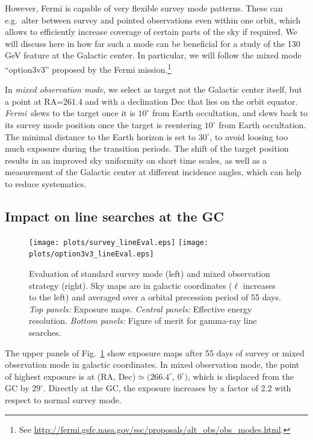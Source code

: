 \documentclass[aps,prd,superscriptaddress,showpacs,nofootinbib,fixlfloat, 12pt]{revtex4-1}
\newcommand{\Fermi}{{\slshape Fermi}}
\begin{document}
However, Fermi is capable of very flexible survey mode patterns. These can
e.g.~alter between survey and pointed observations even within one orbit,
which allows to efficiently increase coverage of certain parts of the sky if
required. We will discuss here in how far such a mode can be beneficial for a
study of the 130 GeV feature at the Galactic center. In particular, we will
follow the mixed mode ``option3v3'' proposed by the Fermi
mission.\footnote{See
\url{http://fermi.gsfc.nasa.gov/ssc/proposals/alt_obs/obs_modes.html}.}

In \emph{mixed observation mode}, we select as target not the Galactic center
itself, but a point at RA=261.4 and with a declination Dec that lies on the
orbit equator. \Fermi\ slews to the target once it is $10^\circ$ from Earth
occultation, and slews back to its survey mode position once the target is
reentering $10^\circ$ from Earth occultation. The minimal distance to the
Earth horizon is set to $30^\circ$, to avoid loosing too much exposure during
the transition periods. The shift of the target position results in an
improved sky uniformity on short time scales, as well as a measurement of the
Galactic center at different incidence angles, which can help to reduce
systematics.

\subsection{Impact on line searches at the GC}

\begin{figure}[t]
  \begin{center}
    \texttt{[image: plots/survey\_lineEval.eps]}
    \texttt{[image: plots/option3v3\_lineEval.eps]}
    \vspace{-0.5cm}
  \end{center}
  \caption{Evaluation of standard survey mode (left) and mixed observation
    strategy (right). Sky maps are in galactic coordinates ($\ell$ increases
    to the left) and averaged over a orbital precession period of 55 days.
    \emph{Top
      panels:} Exposure maps.
    \emph{Central panels:}
    Effective energy resolution.
  \emph{Bottom panels:} Figure of merit for gamma-ray line searches.}
  \label{fig:mollweide}
\end{figure}

The upper panels of Fig.~\ref{fig:mollweide} show exposure maps after 55 days
of survey or mixed observation mode in galactic coordinates. In mixed
observation mode, the point of highest exposure is at (RA,
Dec)$\simeq(266.4^\circ$, $0^\circ)$, which is displaced from the GC by
$29^\circ$. Directly at the GC, the exposure increases by a factor of 2.2 with
respect to normal survey mode.
\end{document}

